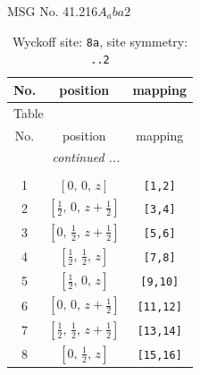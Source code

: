 \documentclass[fleqn,8pt]{jsarticle}
\begin{document}
\setcounter{MaxMatrixCols}{32}

\renewcommand{\tablename}{Table~}
\renewcommand{\figurename}{Figure~}
\begin{center}
\LARGE
MSG No. 41.216\quad$A_{a}ba2$
\end{center}
\renewcommand{\arraystretch}{1.2}
\begin{longtable}{ccc}
\caption{Wyckoff site: {\tt 8a}, site symmetry: {\tt ..2}}
 \\
 \hline \hline
No. & position & mapping \\ \hline \endfirsthead

\multicolumn{2}{l}{\tablename\ \thetable{}} \\
 \hline \hline
No. & position & mapping \\ \hline \endhead

 \hline \hline
\multicolumn{2}{r}{\footnotesize\it continued ...} \\ \endfoot

 \hline \hline
\multicolumn{2}{r}{} \\ \endlastfoot

1 & $\left[ 0,\, 0,\, z \right]$ & {\tt [1,2]} \\ \hline
2 & $\left[ \frac{1}{2},\, 0,\, z + \frac{1}{2} \right]$ & {\tt [3,4]} \\ \hline
3 & $\left[ 0,\, \frac{1}{2},\, z + \frac{1}{2} \right]$ & {\tt [5,6]} \\ \hline
4 & $\left[ \frac{1}{2},\, \frac{1}{2},\, z \right]$ & {\tt [7,8]} \\ \hline
5 & $\left[ \frac{1}{2},\, 0,\, z \right]$ & {\tt [9,10]} \\ \hline
6 & $\left[ 0,\, 0,\, z + \frac{1}{2} \right]$ & {\tt [11,12]} \\ \hline
7 & $\left[ \frac{1}{2},\, \frac{1}{2},\, z + \frac{1}{2} \right]$ & {\tt [13,14]} \\ \hline
8 & $\left[ 0,\, \frac{1}{2},\, z \right]$ & {\tt [15,16]} \\
\end{longtable}
\renewcommand{\arraystretch}{1.2}
\end{document}
